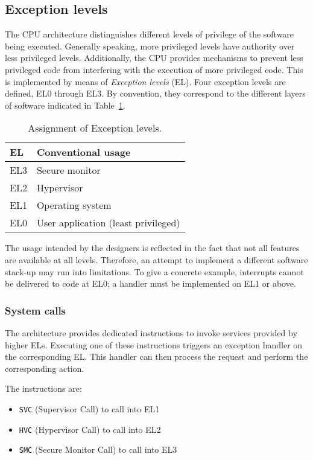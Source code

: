 \subsection{Exception levels}


The CPU architecture distinguishes different levels of privilege of the software being executed. Generally speaking, more privileged levels have authority over less privileged levels. Additionally, the CPU provides mechanisms to prevent less privileged code from interfering with the execution of more privileged code. This is implemented by means of \textit{Exception levels} (EL). Four exception levels are defined, EL0 through EL3. By convention, they correspond to the different layers of software indicated in Table~\ref{tab:exception-levels}.

\begin{table}[h]
  \centering
  \begin{tabular}{ll}\toprule
  \textbf{EL} & \textbf{Conventional usage}\\\midrule
    EL3 & Secure monitor \\
    EL2 & Hypervisor \\
    EL1 & Operating system \\
    EL0 & User application (least privileged) \\\bottomrule
  \end{tabular}

  \caption{Assignment of Exception levels.}
  \label{tab:exception-levels}
\end{table}

The usage intended by the designers is reflected in the fact that not all features are available at all levels. Therefore, an attempt to implement a different software stack-up may run into limitations. To give a concrete example, interrupts cannot be delivered to code at EL0; a handler must be implemented on EL1 or above.

\subsubsection{System calls \label{syscall-instructions}}

The architecture provides dedicated instructions to invoke services provided by higher ELs. Executing one of these instructions triggers an exception handler on the corresponding EL. This handler can then process the request and perform the corresponding action.

The instructions are:

\begin{itemize}
    \item \texttt{SVC} (Supervisor Call) to call into EL1
    \item \texttt{HVC} (Hypervisor Call) to call into EL2
    \item \texttt{SMC} (Secure Monitor Call) to call into EL3
\end{itemize}

